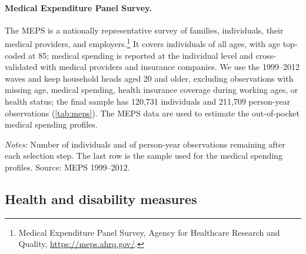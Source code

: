 \paragraph{Medical Expenditure Panel Survey.}
The MEPS is a nationally representative survey of families, individuals, their medical providers, and employers.\footnote{Medical Expenditure Panel Survey, Agency for Healthcare Research and Quality, \url{https://meps.ahrq.gov/}.} It covers individuals of all ages, with age top-coded at 85; medical spending is reported at the individual level and cross-validated with medical providers and insurance companies. %
We use the 1999--2012 waves and keep household heads aged 20 and older, excluding observations with missing age, medical spending, health insurance coverage during working ages, or health status; the final sample has 120,731 individuals and 211,709 person-year observations (\autoref{tab:meps}). %
The MEPS data are used to estimate the out-of-pocket medical spending profiles. %

\begin{table}[!htbp]
\centering
\caption{MEPS Sample Selection}
\label{tab:meps}
\vspace{6pt}
\footnotesize
\begin{threeparttable}

\begin{tablenotes}[flushleft]\scriptsize
\item[] \textit{Notes:} Number of individuals and of person-year observations remaining after each selection step. The last row is the sample used for the medical spending profiles. Source: MEPS 1999--2012.
\end{tablenotes}
\end{threeparttable}
\end{table}

\subsection{Health and disability measures}\label{app:health}

